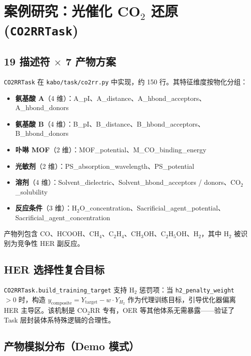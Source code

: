 \documentclass[12pt,a4paper]{article}
\newcommand{\brk}{\discretionary{}{}{}}
\begin{document}
\section{案例研究：光催化 CO$_2$ 还原 (\texttt{CO2RRTask})}

\subsection{\texorpdfstring{19 描述符 $\times$ 7 产物方案}{19 描述符 x 7 产物方案}}

\texttt{CO2RRTask} 在 \texttt{kabo/task/co2rr.py} 中实现，约 150 行。其特征维度按物化分组：

\begin{itemize}
    \item \textbf{氨基酸 A}（4 维）：A\_pI、A\_distance、A\_hbond\_acceptors、A\_hbond\_donors
    \item \textbf{氨基酸 B}（4 维）：B\_pI、B\_distance、B\_hbond\_acceptors、B\_hbond\_donors
    \item \textbf{卟啉 MOF}（2 维）：MOF\_potential、M\_CO\_binding\_energy
    \item \textbf{光敏剂}（2 维）：PS\_absorption\_wavelength、PS\_potential
    \item \textbf{溶剂}（4 维）：Solvent\_dielectric、Solvent\_hbond\_acceptors / donors、CO$_2$\_solubility
    \item \textbf{反应条件}（3 维）：H$_2$O\_\brk concentration、Sacrificial\_\brk agent\_\brk potential、Sacrificial\_\brk agent\_\brk concentration
\end{itemize}

产物列包含 CO、HCOOH、CH$_4$、C$_2$H$_4$、CH$_3$OH、C$_2$H$_5$OH、H$_2$，其中 H$_2$ 被识别为竞争性 HER 副反应。

\subsection{HER 选择性复合目标}

\texttt{CO2RRTask.build\_training\_target} 支持 H$_2$ 惩罚项：当 \texttt{h2\_penalty\_weight} $> 0$ 时，构造 $y_{\text{composite}} = Y_{\text{target}} - w \cdot Y_{H_2}$ 作为代理训练目标，引导优化器偏离 HER 主导区。该机制是 CO$_2$RR 专有，OER 等其他体系无需暴露——验证了 Task 层封装体系特殊逻辑的合理性。

\subsection{产物模拟分布（Demo 模式）}
\end{document}
